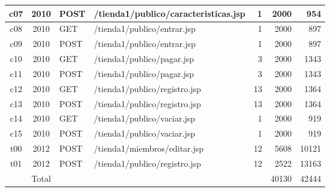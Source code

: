 \begin{frame}
\begin{center}
\begin{tabularx}{\linewidth}{|C|c|ll|r|r|r|}
            c07 & 2010  & POST & /tienda1/publico/caracteristicas.jsp &  1 &  \num{2000} &   \num{954} \\ \hline
            c08 & 2010  & GET  & /tienda1/publico/entrar.jsp          &  1 &  \num{2000} &   \num{897} \\ \hline
            c09 & 2010  & POST & /tienda1/publico/entrar.jsp          &  1 &  \num{2000} &   \num{897} \\ \hline
            c10 & 2010  & GET  & /tienda1/publico/pagar.jsp           &  3 &  \num{2000} &  \num{1343} \\ \hline
            c11 & 2010  & POST & /tienda1/publico/pagar.jsp           &  3 &  \num{2000} &  \num{1343} \\ \hline
            c12 & 2010  & GET  & /tienda1/publico/registro.jsp        & 13 &  \num{2000} &  \num{1364} \\ \hline
            c13 & 2010  & POST & /tienda1/publico/registro.jsp        & 13 &  \num{2000} &  \num{1364} \\ \hline
            c14 & 2010  & GET  & /tienda1/publico/vaciar.jsp          &  1 &  \num{2000} &   \num{919} \\ \hline
            c15 & 2010  & POST & /tienda1/publico/vaciar.jsp          &  1 &  \num{2000} &   \num{919} \\ \hline
            t00 & 2012  & POST & /tienda1/miembros/editar.jsp         & 12 &  \num{5608} & \num{10121} \\ \hline
            t01 & 2012  & POST & /tienda1/publico/registro.jsp        & 12 &  \num{2522} & \num{13163} \\
                & Total &      &                                      &    & \num{40130} & \num{42444} \\ \hline
        \end{tabularx}
    \end{center}
\end{frame}

